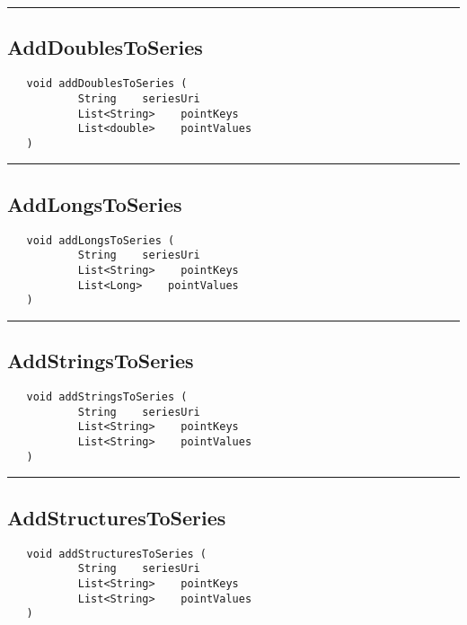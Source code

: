 \rule{15cm}{2pt}
\subsection{AddDoublesToSeries}
\label{Api:AddDoublesToSeries}
\begin{verbatim}
   void addDoublesToSeries (
           String    seriesUri
           List<String>    pointKeys
           List<double>    pointValues
   )
\end{verbatim}



\rule{15cm}{2pt}
\subsection{AddLongsToSeries}
\label{Api:AddLongsToSeries}
\begin{verbatim}
   void addLongsToSeries (
           String    seriesUri
           List<String>    pointKeys
           List<Long>    pointValues
   )
\end{verbatim}



\rule{15cm}{2pt}
\subsection{AddStringsToSeries}
\label{Api:AddStringsToSeries}
\begin{verbatim}
   void addStringsToSeries (
           String    seriesUri
           List<String>    pointKeys
           List<String>    pointValues
   )
\end{verbatim}



\rule{15cm}{2pt}
\subsection{AddStructuresToSeries}
\label{Api:AddStructuresToSeries}
\begin{verbatim}
   void addStructuresToSeries (
           String    seriesUri
           List<String>    pointKeys
           List<String>    pointValues
   )
\end{verbatim}



